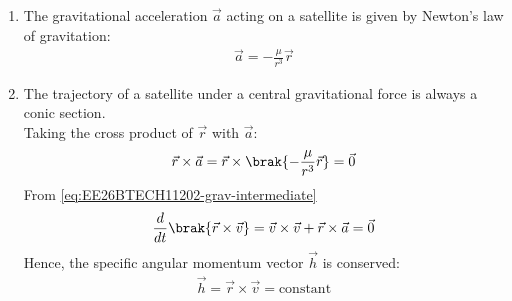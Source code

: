 \begin{enumerate}[label=\thesubsection.\arabic*, ref=\thesubsection.\theenumi]
\begin{align}
\end{align}
where
\begin{align}
	r=\norm{\vec{r}}, v=\norm{\vec{v}}
\end{align}
\item The gravitational acceleration $\vec{a}$ acting on a satellite is given by Newton's law of gravitation:
\begin{align}
\vec{a} = -\frac{\mu}{r^3}\vec{r}
\label{eq:EE26BTECH11202-grav_acc}
\end{align}
\item The trajectory of a satellite under a central gravitational force is always a conic section. \\
\solution
Taking the cross product of $\vec{r}$ with $\vec{a}$:
\begin{align}
	\vec{r} \times \vec{a} = \vec{r} \times \brak{-\frac{\mu}{r^3}\vec{r}} = \vec{0} \label{eq:EE26BTECH11202-grav-intermediate}
\end{align}
From \eqref{eq:EE26BTECH11202-grav-intermediate}
\begin{align}\frac{d}{dt}\brak{\vec{r} \times \vec{v}} = \vec{v} \times \vec{v} + \vec{r} \times \vec{a} = \vec{0}
\end{align}
Hence, the specific angular momentum vector $\vec{h}$ is conserved:
\begin{align}
\vec{h} = \vec{r} \times \vec{v} = \text{constant}
\label{eq:EE26BTECH11202-ang_mom}
\end{align}


\end{enumerate}
